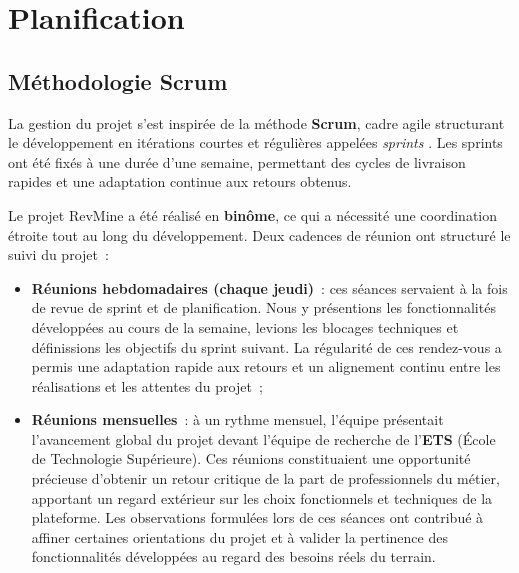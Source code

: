 \section{Planification}

\subsection{Méthodologie Scrum}

La gestion du projet s'est inspirée de la méthode \textbf{Scrum}, cadre agile structurant le
développement en itérations courtes et régulières appelées \textit{sprints}
\parencite{schwaber2020scrum}. Les sprints ont été fixés à une durée d'une semaine, permettant
des cycles de livraison rapides et une adaptation continue aux retours obtenus.

Le projet RevMine a été réalisé en \textbf{binôme}, ce qui a nécessité une coordination étroite
tout au long du développement. Deux cadences de réunion ont structuré le suivi du projet~:

\begin{itemize}
    \item \textbf{Réunions hebdomadaires (chaque jeudi)}~: ces séances servaient à la fois de
          revue de sprint et de planification. Nous y présentions les fonctionnalités développées
          au cours de la semaine, levions les blocages techniques et définissions les objectifs du
          sprint suivant. La régularité de ces rendez-vous a permis une adaptation rapide aux
          retours et un alignement continu entre les réalisations et les attentes du projet~;

    \item \textbf{Réunions mensuelles}~: à un rythme mensuel, l'équipe présentait l'avancement
          global du projet devant l'équipe de recherche de l'\textbf{ETS} (École de Technologie
          Supérieure). Ces réunions constituaient une opportunité précieuse d'obtenir un retour
          critique de la part de professionnels du métier, apportant un regard extérieur sur les
          choix fonctionnels et techniques de la plateforme. Les observations formulées lors de
          ces séances ont contribué à affiner certaines orientations du projet et à valider la
          pertinence des fonctionnalités développées au regard des besoins réels du terrain.
\end{itemize}

